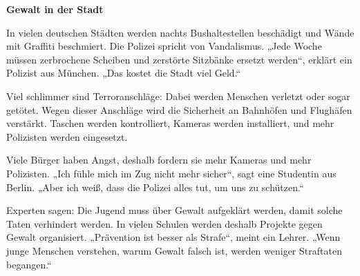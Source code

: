 \documentclass[11pt]{article}
\begin{document}
\begin{textebox}
\textbf{Gewalt in der Stadt}

In vielen deutschen Städten werden nachts Bushaltestellen beschädigt und Wände mit Graffiti beschmiert. Die Polizei spricht von Vandalismus. „Jede Woche müssen zerbrochene Scheiben und zerstörte Sitzbänke ersetzt werden“, erklärt ein Polizist aus München. „Das kostet die Stadt viel Geld.“

Viel schlimmer sind Terroranschläge: Dabei werden Menschen verletzt oder sogar getötet. Wegen dieser Anschläge wird die Sicherheit an Bahnhöfen und Flughäfen verstärkt. Taschen werden kontrolliert, Kameras werden installiert, und mehr Polizisten werden eingesetzt.

Viele Bürger haben Angst, deshalb fordern sie mehr Kameras und mehr Polizisten. „Ich fühle mich im Zug nicht mehr sicher“, sagt eine Studentin aus Berlin. „Aber ich weiß, dass die Polizei alles tut, um uns zu schützen.“

Experten sagen: Die Jugend muss über Gewalt aufgeklärt werden, damit solche Taten verhindert werden. In vielen Schulen werden deshalb Projekte gegen Gewalt organisiert. „Prävention ist besser als Strafe“, meint ein Lehrer. „Wenn junge Menschen verstehen, warum Gewalt falsch ist, werden weniger Straftaten begangen.“
\end{textebox}
\end{document}
